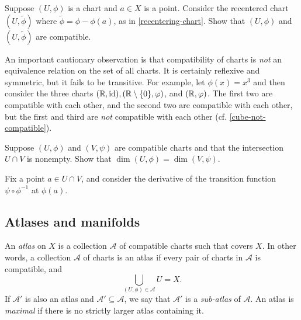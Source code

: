 \begin{exercise}
	Suppose $(U, \phi)$ is a chart and $a \in X$ is a point. Consider the recentered chart $(U, \tilde{\phi})$ where $\tilde{\phi} = \phi - \phi(a)$, as in \cref{recentering-chart}. Show that $(U, \phi)$ and $(U, \tilde{\phi})$ are compatible. 
\end{exercise}

\begin{remark} \label{compatibility-not-equivalence-relation}
	An important cautionary observation is that compatibility of charts is \emph{not} an equivalence relation on the set of all charts. It is certainly reflexive and symmetric, but it fails to be transitive. For example, let $\phi(x) = x^3$ and then consider the three charts $(\mathbb{R}, \mathrm{id}), (\mathbb{R} \setminus \{0\}, \varphi)$, and $(\mathbb{R}, \varphi)$. The first two are compatible with each other, and the second two are compatible with each other, but the first and third are \emph{not} compatible with each other (cf.  \cref{cube-not-compatible}). 
\end{remark}

\begin{exercise} \label{dimension-well-defined}
	Suppose $(U, \phi)$ and $(V, \psi)$ are compatible charts and that the intersection $U \cap V$ is nonempty. Show that $\dim(U,\phi) = \dim(V,\psi)$. 
	\begin{hint}
		Fix a point $a \in U \cap V$, and consider the derivative of the transition function $\psi \circ \phi^{-1}$ at $\phi(a)$. 
	\end{hint}
\end{exercise}

\subsection{Atlases and manifolds}

\begin{definition}[Atlas]   
	An \emph{atlas} on $X$ is a collection $\mathscr{A}$ of compatible charts such that covers $X$. In other words, a collection $\mathscr{A}$ of charts is an atlas if every pair of charts in $\mathscr{A}$ is compatible, and \[ \bigcup_{(U, \phi) \in \mathscr{A}} U = X. \]
	If $\mathscr{A}'$ is also an atlas and $\mathscr{A}' \subseteq \mathscr{A}$, we say that $\mathscr{A}'$ is a \emph{sub-atlas} of $\mathscr{A}$. An atlas is \emph{maximal} if there is no strictly larger atlas containing it.
\end{definition}

